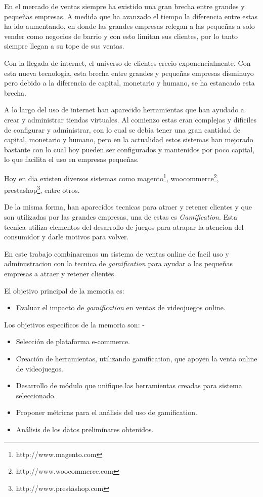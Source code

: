 En el mercado de ventas siempre ha existido una gran brecha entre grandes y pequeñas 
empresas. A medida que ha avanzado el tiempo la diferencia entre estas ha ido aumentando,
en donde las grandes empresas relegan a las pequeñas a solo vender como negocios de 
barrio y con esto limitan sus clientes, por lo tanto siempre llegan a su tope de sus ventas. 

Con la llegada de internet, el universo de clientes crecio exponencialmente. Con esta nueva
tecnologia, esta brecha entre grandes y pequeñas empresas disminuyo pero debido a la
 diferencia de capital, monetario y humano, se ha estancado esta brecha. 

A lo largo del uso de internet han aparecido herramientas que han ayudado a crear y
administrar tiendas virtuales. Al comienzo estas eran complejas y dificiles de configurar
y administrar, con lo cual se debia tener una gran cantidad de capital, monetario y humano,
pero en la actualidad estos sistemas han mejorado bastante con lo cual hoy pueden ser
configurados y mantenidos por poco capital, lo que facilita el uso en empresas pequeñas.

Hoy en dia existen diversos sistemas como magento\footnote{http://www.magento.com}, 
woocommerce\footnote{http://www.woocommerce.com}, prestashop\footnote{http://www.prestashop.com},
entre otros. 

De la misma forma, han aparecidos tecnicas para atraer y retener clientes y que son utilizadas
por las grandes empresas, una de estas es \emph{Gamification}. Esta tecnica utiliza elementos
del desarrollo de juegos para atrapar la atencion del consumidor y darle motivos para volver.

En este trabajo combinaremos un sistema de ventas online de facil uso y adminustracion con
la tecnica de \emph{gamification} para ayudar a las pequeñas empresas a atraer y retener 
clientes.

El objetivo principal de la memoria es:
\begin{itemize}
\item Evaluar el impacto de \emph{gamification} en ventas de videojuegos online.
\end{itemize}

Los objetivos especificos de la memoria son:
-
\begin{itemize}                                                                      
\item Selección de plataforma e-commerce.
\item Creación de herramientas, utilizando gamification, que apoyen la venta online 
de videojuegos.
\item Desarrollo de módulo que unifique las herramientas creadas para sistema 
seleccionado.
\item Proponer métricas para el análisis del uso de gamification.
\item Análisis de los datos preliminares obtenidos.     
\end{itemize}

